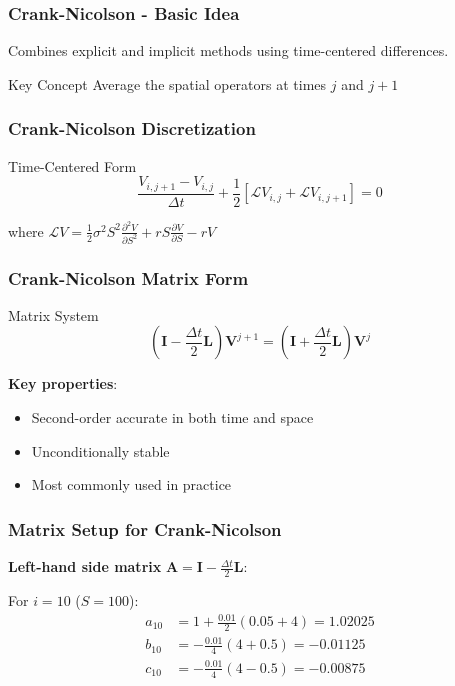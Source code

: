 \documentclass[aspectratio=169]{beamer}
\begin{document}
\begin{frame}
\frametitle{Crank-Nicolson - Basic Idea}
Combines explicit and implicit methods using time-centered differences.

\begin{block}{Key Concept}
Average the spatial operators at times \(j\) and \(j+1\)
\end{block}
\end{frame}

\begin{frame}
\frametitle{Crank-Nicolson Discretization}
\begin{block}{Time-Centered Form}
\[\frac{V_{i,j+1} - V_{i,j}}{\Delta t} + \frac{1}{2}\left[ \mathcal{L}V_{i,j} + \mathcal{L}V_{i,j+1} \right] = 0\]

where \(\mathcal{L}V = \frac{1}{2}\sigma^2 S^2 \frac{\partial^2 V}{\partial S^2} + rS \frac{\partial V}{\partial S} - rV\)
\end{block}
\end{frame}

\begin{frame}
\frametitle{Crank-Nicolson Matrix Form}
\begin{block}{Matrix System}
\[\left( \mathbf{I} - \frac{\Delta t}{2}\mathbf{L} \right) \mathbf{V}^{j+1} = \left( \mathbf{I} + \frac{\Delta t}{2}\mathbf{L} \right) \mathbf{V}^j\]
\end{block}

\textbf{Key properties}:
\begin{itemize}
\item Second-order accurate in both time and space
\item Unconditionally stable
\item Most commonly used in practice
\end{itemize}
\end{frame}

\begin{frame}
\frametitle{Matrix Setup for Crank-Nicolson}
\textbf{Left-hand side matrix} \(\mathbf{A} = \mathbf{I} - \frac{\Delta t}{2}\mathbf{L}\):

For \(i = 10\) (\(S = 100\)):
\begin{align}
a_{10} &= 1 + \frac{0.01}{2}(0.05 + 4) = 1.02025 \\
b_{10} &= -\frac{0.01}{4}(4 + 0.5) = -0.01125 \\
c_{10} &= -\frac{0.01}{4}(4 - 0.5) = -0.00875
\end{align}
\end{frame}
\end{document}

